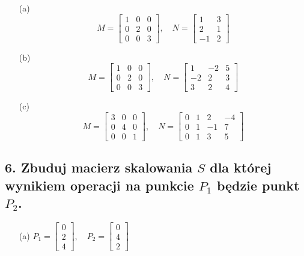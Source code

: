 \begin{enumerate}
        \item[(a)] 
        \[
        M = \begin{bmatrix} 
        1 & 0 & 0 \\ 
        0 & 2 & 0 \\ 
        0 & 0 & 3 
        \end{bmatrix}, 
        \quad
        N = \begin{bmatrix} 
        1 & 3 \\ 
        2 & 1 \\ 
        -1 & 2 
        \end{bmatrix}
        \]
    
        \item[(b)] 
        \[
        M = \begin{bmatrix} 
        1 & 0 & 0 \\ 
        0 & 2 & 0 \\ 
        0 & 0 & 3 
        \end{bmatrix}, 
        \quad
        N = \begin{bmatrix} 
        1 & -2 & 5 \\ 
        -2 & 2 & 3 \\ 
        3 & 2 & 4 
        \end{bmatrix}
        \]
    
        \item[(c)] 
        \[
        M = \begin{bmatrix} 
        3 & 0 & 0 \\ 
        0 & 4 & 0 \\ 
        0 & 0 & 1 
        \end{bmatrix}, 
        \quad
        N = \begin{bmatrix} 
        0 & 1 & 2 & -4 \\ 
        0 & 1 & -1 & 7 \\ 
        0 & 1 & 3 & 5 
        \end{bmatrix}
        \]
\end{enumerate}

\subsection*{6. Zbuduj macierz skalowania \( S \) dla której wynikiem operacji na punkcie \( P_1 \) będzie punkt \( P_2 \).}

\begin{enumerate}
    \item[(a)] \( P_1 = \begin{bmatrix} 0 \\ 2 \\ 4 \end{bmatrix}, \quad
    P_2 = \begin{bmatrix} 0 \\ 4 \\ 2 \end{bmatrix} \)
\end{enumerate}

